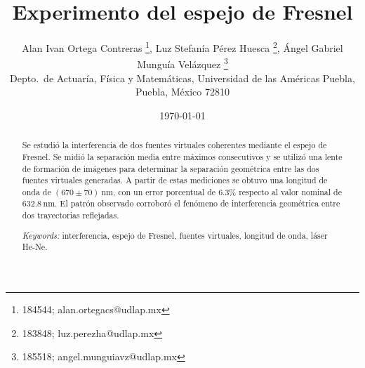 \documentclass{article}
\begin{document}

\renewcommand{\footrulewidth}{1pt}
\renewcommand{\tablename}{Tabla}


\title{Experimento del espejo de Fresnel\\ \small{}}
\author{\small Alan Ivan Ortega Contreras \footnote{184544; alan.ortegacs@udlap.mx}, Luz Stefanía Pérez Huesca \footnote{183848; luz.perezha@udlap.mx}, Ángel Gabriel Munguía Velázquez \footnote{185518; angel.munguiavz@udlap.mx}\\
    \small Depto.~de Actuaría, Física y Matemáticas, Universidad de las Américas Puebla, Puebla, M\'exico 72810}
\date{\small{\today}}

\maketitle


\begin{abstract}
Se estudió la interferencia de dos fuentes virtuales coherentes mediante el espejo de Fresnel. Se midió la separación media entre máximos consecutivos y se utilizó una lente de formación de imágenes para determinar la separación geométrica entre las dos fuentes virtuales generadas. A partir de estas mediciones se obtuvo una longitud de onda de $(670\pm70)\ \mathrm{nm}$, con un error porcentual de $6.3\%$ respecto al valor nominal de $632.8\ \mathrm{nm}$. El patrón observado corroboró el fenómeno de interferencia geométrica entre dos trayectorias reflejadas.

\medskip
\noindent\textit{Keywords:} interferencia, espejo de Fresnel, fuentes virtuales, longitud de onda, láser He-Ne.
\end{abstract}

\end{document}
